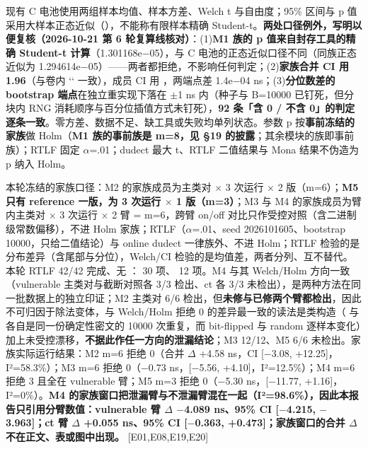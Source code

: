 \documentclass[UTF8,fontset=fandol,11pt,a4paper]{ctexart}
\begin{document}
现有 C 电池使用两组样本均值、样本方差、Welch t 与自由度；95\% 区间与 p 值采用大样本正态近似（\texttt{}），不能称有限样本精确 Student-t。\textbf{两处口径例外，写明以便复核（2026-10-21 第 6 轮复算线核对）}：(1)\textbf{M1 族的 p 值来自封存工具的精确 Student-t 计算}（1.301168e\texorpdfstring{$-$}{-}05），与 C 电池的正态近似口径不同（同族正态近似为 1.294614e\texorpdfstring{$-$}{-}05）——两者都拒绝，不影响任何判定；(2)\textbf{家族合并 CI 用 1.96}（与卷内 `\texttt{}` 一致），成员 CI 用 \texttt{}，两端点差 1.4e\texorpdfstring{$-$}{-}04 ns；(3)\textbf{分位数差的 bootstrap 端点}在独立重实现下落在 \texorpdfstring{$\pm$}{+-}1 ns 内（种子与 B=10000 已钉死，但分块内 RNG 消耗顺序与百分位插值方式未钉死），\textbf{92 条「含 0 / 不含 0」的判定逐条一致}。零方差、数据不足、缺工具或失败均单列状态。参数 p 按\textbf{事前冻结的家族}做 Holm（\textbf{M1 族的事前族是 m=8，见 §19 的披露}；其余模块的族即事前族）；RTLF 固定 \texorpdfstring{$\alpha$}{alpha}=.01；dudect 最大 t、RTLF 二值结果与 Mona 结果不伪造为 p 纳入 Holm。


本轮冻结的家族口径：M2 的家族成员为主类对 \texorpdfstring{$\times$}{x} 3 次运行 \texorpdfstring{$\times$}{x} 2 版（m=6）；\textbf{M5 只有 reference 一版，为 3 次运行 \texorpdfstring{$\times$}{x} 1 版（m=3）}；M3 与 M4 的家族成员为臂内主类对 \texorpdfstring{$\times$}{x} 3 次运行 \texorpdfstring{$\times$}{x} 2 臂 = m=6，跨臂 on/off 对比只作受控对照（含二进制级常数偏移），不进 Holm 家族；RTLF（\texorpdfstring{$\alpha$}{alpha}=.01、seed 2026101605、bootstrap 10000，只给二值结论）与 online dudect 一律族外、不进 Holm；RTLF 检验的是分布差异（含尾部与分位），Welch/CI 检验的是均值差，两者分列、互不替代。本轮 RTLF 42/42 完成、无 \texttt{}：\texttt{} 30 项、\texttt{} 12 项。M4 与其 Welch/Holm 方向一致（vulnerable 主类对与截断对照各 3/3 检出、ct 各 3/3 未检出），是两种方法在同一批数据上的独立印证；M2 主类对 6/6 检出，但\textbf{未修与已修两个臂都检出}，因此不可归因于除法变体，与 Welch/Holm 拒绝 0 的差异最一致的读法是类构造（\texttt{} 与 \texttt{} 各自是同一份确定性密文的 10000 次重复，而 bit-flipped 与 random 逐样本变化）加上未受控漂移，\textbf{不据此作任一方向的泄漏结论}；M3 12/12、M5 6/6 未检出。家族实际运行结果：M2 m=6 拒绝 0（合并 \texorpdfstring{$\Delta$}{Delta} +4.58 ns，CI [\texorpdfstring{$-$}{-}3.08, +12.25]，I²=58.3\%）；M3 m=6 拒绝 0（\texorpdfstring{$-$}{-}0.73 ns，[\texorpdfstring{$-$}{-}5.56, +4.10]，I²=12.5\%）；M4 m=6 拒绝 3 且全在 vulnerable 臂；M5 m=3 拒绝 0（\texorpdfstring{$-$}{-}5.30 ns，[\texorpdfstring{$-$}{-}11.77, +1.16]，I²=0\%）。\textbf{M4 的家族窗口把泄漏臂与不泄漏臂混在一起（I²=98.6\%），因此本报告只引用分臂数值：vulnerable 臂 \texorpdfstring{$\Delta$}{Delta} \texorpdfstring{$-$}{-}4.089 ns、95\% CI [\texorpdfstring{$-$}{-}4.215, \texorpdfstring{$-$}{-}3.963]；ct 臂 \texorpdfstring{$\Delta$}{Delta} +0.055 ns、95\% CI [\texorpdfstring{$-$}{-}0.363, +0.473]；家族窗口的合并 \texorpdfstring{$\Delta$}{Delta} 不在正文、表或图中出现。} [E01,E08,E19,E20]
\end{document}
